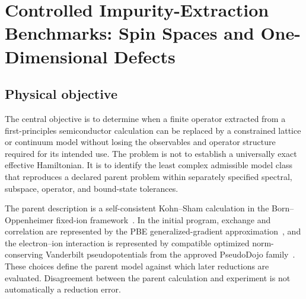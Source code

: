 \chapter[Controlled Impurity-Extraction Benchmarks]{Controlled Impurity-Extraction Benchmarks: Spin Spaces and One-Dimensional Defects}

\label{app:impurity-model-classes}


\section{Physical objective}

The central objective is to determine when a finite operator extracted from a
first-principles semiconductor calculation can be replaced by a constrained
lattice or continuum model without losing the observables and operator
structure required for its intended use. The problem is not to establish a
universally exact effective Hamiltonian. It is to identify the least complex
admissible model class that reproduces a declared parent problem within
separately specified spectral, subspace, operator, and bound-state tolerances.

The parent description is a self-consistent Kohn--Sham calculation in the
Born--Oppenheimer fixed-ion framework~\cite{hohenberg1964,kohn1965}. In the
initial program, exchange and correlation are represented by the PBE
generalized-gradient approximation~\cite{perdew1996}, and the electron--ion
interaction is represented by compatible optimized norm-conserving Vanderbilt
pseudopotentials from the approved PseudoDojo family~\cite{hamann2013,vansetten2018}.
These choices define the
parent model against which later reductions are evaluated. Disagreement between
the parent calculation and experiment is not automatically a reduction error.

